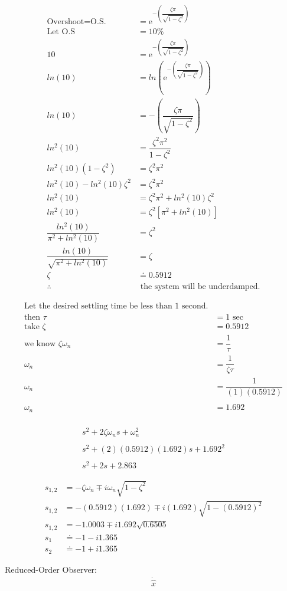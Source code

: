 \documentclass[12pt]{report}
\begin{document}
\begin{align}
\text{Overshoot} = \text{O.S.} &= \mathrm{e}^{-\left(\dfrac{\zeta\pi}{\sqrt{1 - \zeta^{2}}}\right)}\\
\text{Let O.S} &= 10\%\\
10 &= \mathrm{e}^{-\left(\dfrac{\zeta\pi}{\sqrt{1 - \zeta^{2}}}\right)}\\
ln(10) &= ln\left(\mathrm{e}^{-\left(\dfrac{\zeta\pi}{\sqrt{1 - \zeta^{2}}}\right)}\right)\\
ln(10) &= -\left(\dfrac{\zeta\pi}{\sqrt{1 - \zeta^{2}}}\right)\\
ln^{2}(10) &= \dfrac{\zeta^{2}\pi^{2}}{1 - \zeta^{2}}\\
ln^{2}(10)(1 - \zeta^{2}) &= \zeta^{2}\pi^{2}\\
ln^{2}(10)- ln^{2}(10)\zeta^{2} &= \zeta^{2}\pi^{2}\\
ln^{2}(10) &= \zeta^{2}\pi^{2} + ln^{2}(10)\zeta^{2}\\
ln^{2}(10) &= \zeta^{2}[\pi^{2} + ln^{2}(10)]\\
\dfrac{ln^{2}(10)}{\pi^{2} + ln^{2}(10)} &= \zeta^{2}\\
\dfrac{ln(10)}{\sqrt{\pi^{2} + ln^{2}(10)}} &= \zeta\\
\zeta &\doteq 0.5912\\\nonumber
\therefore &\text{ the system will be underdamped.}
\end{align}

\begin{align}
\nonumber
\text{Let the desired settling time be less than 1 second.}\\\nonumber
\text{then }\tau &= 1 \text{ sec}\\\nonumber
\text{take }\zeta &= 0.5912\\
\text{we know }\zeta\omega_{n} &= \dfrac{1}{\tau}\\
\omega_{n} &= \dfrac{1}{\zeta\tau}\\
\omega_{n} &= \dfrac{1}{(1)(0.5912)}\\\nonumber
\\
\omega_{n} &= 1.692\\\nonumber
\end{align}

\begin{align}
s^{2} + 2\zeta\omega_{n}s + \omega_{n}^{2}\\\nonumber
\\
s^{2} + (2)(0.5912)(1.692)s + 1.692^{2}\\\nonumber
\\
s^{2} + 2s + 2.863
\end{align}

\begin{align}
s_{1,2} &= -\zeta\omega_{n} \mp i\omega_{n}\sqrt{1 - \zeta^{2}}\\
s_{1,2} &= -(0.5912)(1.692) \mp i(1.692)\sqrt{1-(0.5912)^{2}}\\
s_{1,2} &= -1.0003 \mp i1.692\sqrt{0.6505}\\
s_{1} &\doteq -1 - i1.365\\
s_{2} &\doteq -1 + i1.365
\end{align}

Reduced-Order Observer:
\begin{align}
\dot{\hat{x}}
\end{align}
\end{document}
